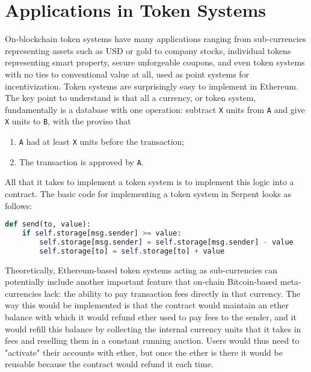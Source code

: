 \section{Applications in Token Systems}
On-blockchain token systems have many applications ranging from sub-currencies representing assets such as USD or gold to company stocks, individual tokens representing smart property, secure unforgeable coupons, and even token systems with no ties to conventional value at all, used as point systems for incentivization. \newline
Token systems are surprisingly easy to implement in Ethereum. The key point to understand is that all a currency, or token system, fundamentally is a database with one operation: subtract \texttt{X} units from \texttt{A} and give \texttt{X} units to \texttt{B}, with the proviso that 
\begin{enumerate}
    \item \texttt{A} had at least \texttt{X} units before the transaction;
    \item The transaction is approved by \texttt{A}.
\end{enumerate}

All that it takes to implement a token system is to implement this logic into a contract.
The basic code for implementing a token system in Serpent looks as follows:
\begin{lstlisting}[language=Python]
def send(to, value):
    if self.storage[msg.sender] >= value:
        self.storage[msg.sender] = self.storage[msg.sender] - value
        self.storage[to] = self.storage[to] + value
\end{lstlisting}

Theoretically, Ethereum-based token systems acting as sub-currencies can potentially include another important feature that on-chain Bitcoin-based meta-currencies lack: the ability to pay transaction fees directly in that currency. The way this would be implemented is that the contract would maintain an ether balance with which it would refund ether used to pay fees to the sender, and it would refill this balance by collecting the internal currency units that it takes in fees and reselling them in a constant running auction. Users would thus need to "activate" their accounts with ether, but once the ether is there it would be reusable because the contract would refund it each time.